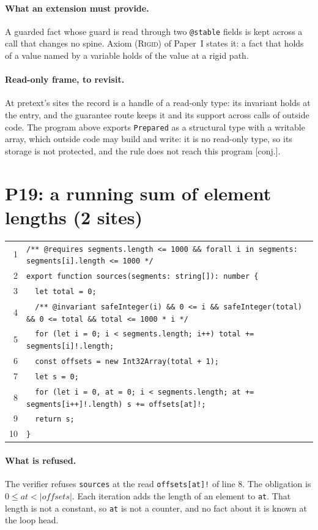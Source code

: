 \documentclass[10pt,a4paper]{article}
\theoremstyle{definition}
\theoremstyle{remark}
\newcommand{\len}[1]{|#1|}
\newcommand{\code}[1]{\texttt{#1}}
\newcommand{\status}[1]{\textsf{\small[#1]}}
\newcommand{\entry}[1]{\paragraph{#1.}}
\begin{document}
\entry{What an extension must provide} A guarded fact whose guard is read through two
\code{@stable} fields is kept across a call that changes no spine.
Axiom \textsc{(Rigid)} of Paper~I states it: a fact that holds of a
value named by a variable holds of the value at a rigid path.

\entry{Read-only frame, to revisit} At pretext's sites the record is a
handle of a read-only type: its invariant holds at the entry, and the
guarantee route keeps it and its support across calls of outside code.
The program above exports \code{Prepared} as a structural type with a
writable array, which outside code may build and write: it is no
read-only type, so its storage is not protected, and the rule does not
reach this program
\status{conj.}.

\section{P19: a running sum of element lengths (2 sites)}

{\footnotesize
\begin{tabular}{@{}r@{\hspace{1em}}l@{}}
1 & \code{/** @requires segments.length <= 1000 \&\& forall i in segments: segments[i].length <= 1000 */} \\
2 & \code{export function sources(segments: string[]): number \{} \\
3 & \code{~~let total = 0;} \\
4 & \code{~~/** @invariant safeInteger(i) \&\& 0 <= i \&\& safeInteger(total) \&\& 0 <= total \&\& total <= 1000 * i */} \\
5 & \code{~~for (let i = 0; i < segments.length; i++) total += segments[i]!.length;} \\
6 & \code{~~const offsets = new Int32Array(total + 1);} \\
7 & \code{~~let s = 0;} \\
8 & \code{~~for (let i = 0, at = 0; i < segments.length; at += segments[i++]!.length) s += offsets[at]!;} \\
9 & \code{~~return s;} \\
10 & \code{\}} \\
\end{tabular}}

\entry{What is refused} The verifier refuses \code{sources} at the read
\code{offsets[at]!} of line 8. The obligation is
$0\le\mathit{at}<\len{\mathit{offsets}}$. Each iteration adds the
length of an element to \code{at}. That length is not a constant, so
\code{at} is not a counter, and no fact about it is known at the loop
head.
\end{document}
